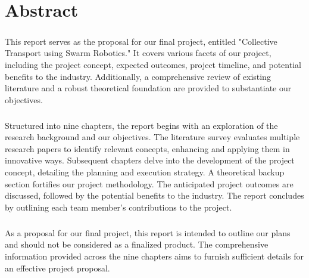 \chapter*{Abstract}

\paragraph*{}
This report serves as the proposal for our final project, entitled "Collective Transport using Swarm Robotics." It covers various facets of our project, including the project concept, expected outcomes, project timeline, and potential benefits to the industry. Additionally, a comprehensive review of existing literature and a robust theoretical foundation are provided to substantiate our objectives.

\paragraph*{}
Structured into nine chapters, the report begins with an exploration of the research background and our objectives. The literature survey evaluates multiple research papers to identify relevant concepts, enhancing and applying them in innovative ways. Subsequent chapters delve into the development of the project concept, detailing the planning and execution strategy. A theoretical backup section fortifies our project methodology. The anticipated project outcomes are discussed, followed by the potential benefits to the industry. The report concludes by outlining each team member's contributions to the project.

\paragraph*{}
As a proposal for our final project, this report is intended to outline our plans and should not be considered as a finalized product. The comprehensive information provided across the nine chapters aims to furnish sufficient details for an effective project proposal.
